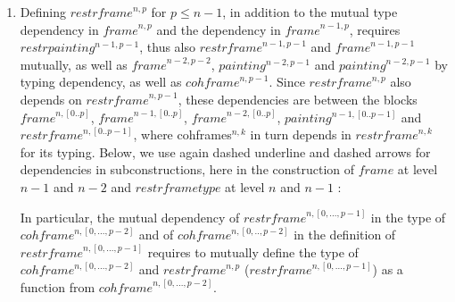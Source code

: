\documentclass{article}
\newcommand{\myframe}{\mathit{frame}}
\newcommand{\painting}{\mathit{painting}}
\newcommand{\restrframe}{\mathit{restrframe}}
\newcommand{\restrframetype}{\mathit{restrframetype}}
\newcommand{\restrpainting}{\mathit{restrpainting}}
\newcommand{\cohframe}{\mathit{cohframe}}
\newcommand{\udensdash}[1]{%
    \tikz[baseline=(todotted.base)]{
        \node[inner sep=1pt,outer sep=0pt] (todotted) {$#1$};
        \draw[densely dashed] (todotted.south west) -- (todotted.south east);
    }%
}%
\begin{document}
\begin{enumerate}
  \item Defining $\restrframe^{n,p}$ for $p\leq n-1$, in addition to the
        mutual type dependency in $\myframe^{n,p}$ and the dependency in
        $\myframe^{n-1,p}$, requires $\restrpainting^{n-1,p-1}$, thus also
        $\restrframe^{n-1,p-1}$ and $\myframe^{n-1,p-1}$ mutually, as well
        as $\myframe^{n-2,p-2}$, $painting^{n-2,p-1}$ and
        $\painting^{n-2,p-1}$ by typing dependency, as well as
        $\cohframe^{n,p-1}$. Since $\restrframe^{n,p}$ also depends on
        $\restrframe^{n,p-1}$, these dependencies are between the blocks
        $\myframe^{n,[0..p]}$, $\myframe^{n-1,[0..p]}$,
        $\myframe^{n-2,[0..p]}$, $\painting^{n-1,[0..p-1]}$ and
        $\restrframe^{n,[0..p-1]}$, where cohframes$^{n,k}$ in turn depends
        in $\restrframe^{n,k}$ for its typing. Below, we use again dashed
        underline and dashed arrows for dependencies in subconstructions,
        here in the construction of $\myframe$ at level $n-1$ and $n-2$ and $\restrframetype$ at level $n$ and $n-1$ :

        \begin{center}
        \end{center}

        In particular, the mutual dependency of $\restrframe^{n,[0,...,p-1]}$
        in the type of $\cohframe^{n,[0,...,p-2]}$ and of
        $\cohframe^{n,[0,..,p-2]}$ in the definition of
        $\restrframe^{n,[0,...,p-1]}$ requires to mutually define the type of
        $\cohframe^{n,[0,...,p-2]}$ and $\restrframe^{n,p}$
        ($\restrframe^{n,[0,...,p-1]}$) as a function from
        $\cohframe^{n,[0,...,p-2]}$.


\end{enumerate}
\end{document}
